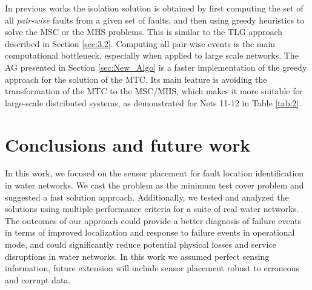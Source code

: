 \documentclass[twocolumn]{autart}
\begin{document}
{In previous works \cite{krysander2008sensor,Raghuraj,svard2013realizability} the isolation solution is obtained by first computing the set of all \textit{pair-wise} faults from a given set of faults, and then using greedy heuristics to solve the MSC or the MHS problems. This is similar to the TLG approach described in Section \ref{sec:3.2}. Computing all pair-wise events is the main computational bottleneck, especially when applied to large scale networks. The AG presented in Section \ref{sec:New_Algo} is a faster implementation of the greedy approach for the solution of the MTC. Its main feature is avoiding the transformation of the MTC to the MSC/MHS, which makes it more suitable for large-scale distributed systems, as demonstrated for Nets 11-12 in Table \ref{tab:2}.}

\section{Conclusions and future work}
\label{sec:conclusions} \vspace{-0.35cm}
In this work, we focused on the sensor placement for fault location identification in water networks. We cast the problem as the minimum test cover problem and suggested a fast solution approach. Additionally, we tested and analyzed the solutions using multiple performance criteria for a suite of real water networks. The outcomes of our approach could provide a better diagnosis of failure events in terms of improved localization and response to failure events in operational mode, and could significantly reduce potential physical losses and service disruptions in water networks. In this work we assumed perfect sensing information, future extension will include sensor placement robust to erroneous and corrupt data.
\vspace{-0.35cm}
\end{document}
